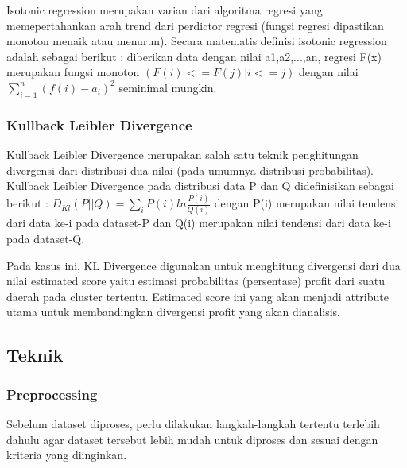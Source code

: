 \documentclass{article}
\begin{document}
Isotonic regression merupakan varian dari algoritma regresi yang memepertahankan arah trend dari perdictor regresi (fungsi regresi dipastikan monoton menaik atau menurun). Secara matematis definisi isotonic regression adalah sebagai berikut : diberikan data dengan nilai a1,a2,...,an, regresi F(x) merupakan fungsi monoton $(F(i) <= F(j) | i <= j)$  dengan nilai $\sum\limits_{i=1}^n({f(i)-a_{i}})^2$ seminimal mungkin.

\subsubsection{Kullback Leibler Divergence}

Kullback Leibler Divergence merupakan salah satu teknik penghitungan divergensi dari distribusi dua nilai (pada umumnya distribusi probabilitas). Kullback Leibler Divergence pada distribusi data  P dan Q  didefinisikan sebagai berikut :
$D_{Kl}(P||Q) = \sum\limits_{i}P(i)ln\frac{P(i)}{Q(i)}$
dengan P(i) merupakan nilai tendensi dari data ke-i pada dataset-P dan Q(i) merupakan nilai tendensi dari data ke-i pada dataset-Q.

Pada kasus ini, KL Divergence digunakan untuk menghitung divergensi dari dua nilai estimated score yaitu estimasi probabilitas (persentase) profit dari suatu daerah pada cluster tertentu. Estimated score ini  yang akan menjadi attribute utama untuk membandingkan divergensi profit yang akan dianalisis.

\subsection{Teknik}

\subsubsection{Preprocessing}

Sebelum dataset diproses, perlu dilakukan langkah-langkah tertentu terlebih dahulu agar dataset tersebut lebih mudah untuk diproses dan sesuai dengan kriteria yang diinginkan.
\end{document}
